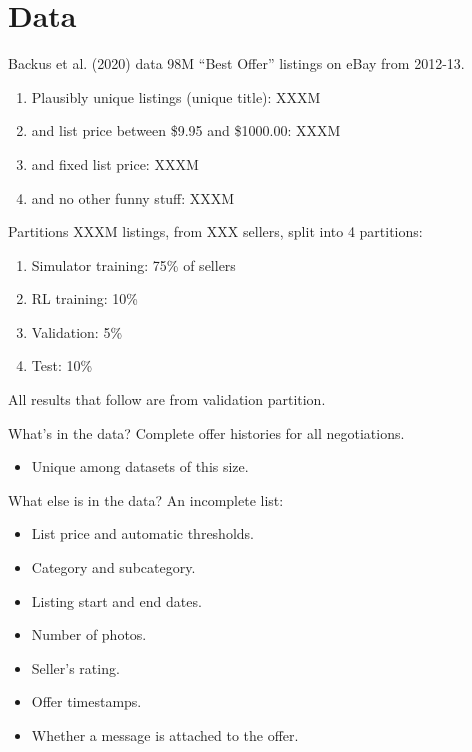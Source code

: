\documentclass{beamer}
\begin{document}
\section{Data}\label{sec:data}

\begin{frame}{Backus et al. (2020) data}
	98M ``Best Offer'' listings on eBay from 2012-13.\pause
	\begin{enumerate}
		\item Plausibly unique listings (unique title): XXXM\pause
		\item and list price between \$9.95 and \$1000.00: XXXM\pause
		\item and fixed list price: XXXM\pause
		\item and no other funny stuff: XXXM
	\end{enumerate}
\end{frame}

\begin{frame}{Partitions}
	XXXM listings, from XXX sellers, split into 4 partitions:
	\begin{enumerate}
		\item Simulator training: 75\% of sellers
		\item RL training: 10\%
		\item Validation: 5\%
		\item Test: 10\%
	\end{enumerate}
	\vspace{5mm}
	All results that follow are from validation partition.
\end{frame}

\begin{frame}{What's in the data?}
	Complete offer histories for all negotiations.
	\begin{itemize}
		\item Unique among datasets of this size.
	\end{itemize}
\end{frame}

\begin{frame}{What else is in the data?}
	An incomplete list:
	\begin{itemize}
		\item List price and automatic thresholds.
		\item Category and subcategory.
		\item Listing start and end dates.
		\item Number of photos.
		\item Seller's rating.
		\item Offer timestamps.
		\item Whether a message is attached to the offer.
	\end{itemize}
\end{frame}
\end{document}
